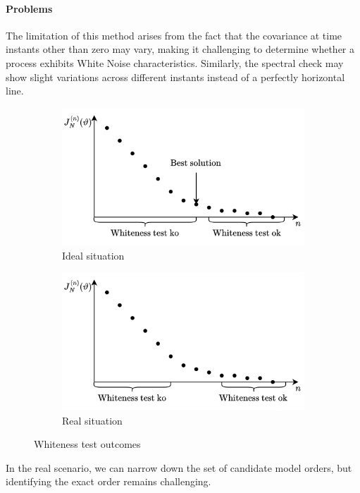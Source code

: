 \paragraph*{Problems}
The limitation of this method arises from the fact that the covariance at time instants other than zero may vary, making it challenging to determine whether a process exhibits White Noise characteristics.
Similarly, the spectral check may show slight variations across different instants instead of a perfectly horizontal line.
\begin{figure}[H]
    \centering
    \begin{subfigure}{0.49\textwidth}
        \centering
        \includegraphics[width=0.9\linewidth]{images/wone.png} 
        \caption{Ideal situation}
    \end{subfigure}
    \begin{subfigure}{0.49\textwidth}
        \centering
        \includegraphics[width=0.9\linewidth]{images/wtwo.png}
        \caption{Real situation}
    \end{subfigure}
    \caption{Whiteness test outcomes}
\end{figure}
In the real scenario, we can narrow down the set of candidate model orders, but identifying the exact order remains challenging.

